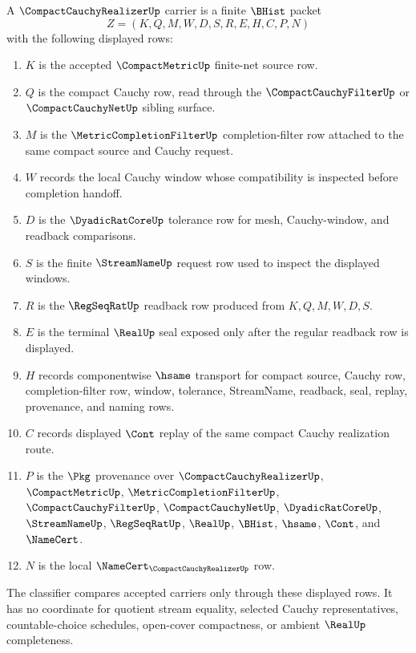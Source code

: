 \begin{definition}
\label{def:compact-cauchy-realizer-carrier}
A $\CompactCauchyRealizerUp$ carrier is a finite $\BHist$ packet
$$
Z=(K,Q,M,W,D,S,R,E,H,C,P,N)
$$
with the following displayed rows:
\begin{enumerate}
\item $K$ is the accepted $\CompactMetricUp$ finite-net source row.
\item $Q$ is the compact Cauchy row, read through the $\CompactCauchyFilterUp$ or $\CompactCauchyNetUp$ sibling surface.
\item $M$ is the $\MetricCompletionFilterUp$ completion-filter row attached to the same compact source and Cauchy request.
\item $W$ records the local Cauchy window whose compatibility is inspected before completion handoff.
\item $D$ is the $\DyadicRatCoreUp$ tolerance row for mesh, Cauchy-window, and readback comparisons.
\item $S$ is the finite $\StreamNameUp$ request row used to inspect the displayed windows.
\item $R$ is the $\RegSeqRatUp$ readback row produced from $K,Q,M,W,D,S$.
\item $E$ is the terminal $\RealUp$ seal exposed only after the regular readback row is displayed.
\item $H$ records componentwise $\hsame$ transport for compact source, Cauchy row, completion-filter row, window, tolerance, StreamName, readback, seal, replay, provenance, and naming rows.
\item $C$ records displayed $\Cont$ replay of the same compact Cauchy realization route.
\item $P$ is the $\Pkg$ provenance over $\CompactCauchyRealizerUp$, $\CompactMetricUp$, $\MetricCompletionFilterUp$, $\CompactCauchyFilterUp$, $\CompactCauchyNetUp$, $\DyadicRatCoreUp$, $\StreamNameUp$, $\RegSeqRatUp$, $\RealUp$, $\BHist$, $\hsame$, $\Cont$, and $\NameCert$.
\item $N$ is the local $\NameCert_{\CompactCauchyRealizerUp}$ row.
\end{enumerate}
The classifier compares accepted carriers only through these displayed rows. It has no coordinate for quotient stream equality, selected Cauchy representatives, countable-choice schedules, open-cover compactness, or ambient $\RealUp$ completeness.
\end{definition}

